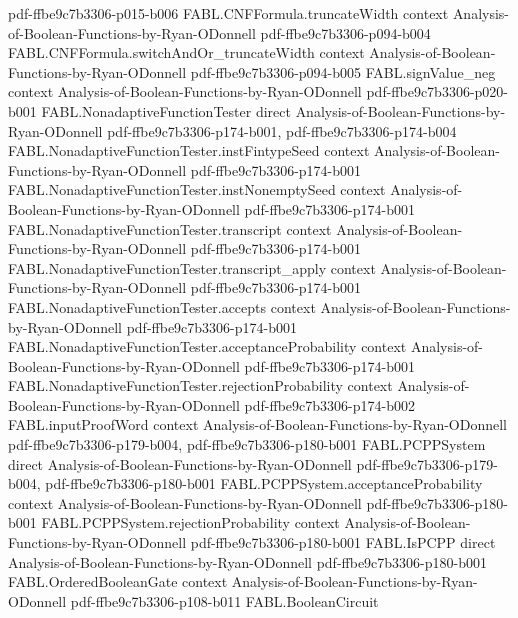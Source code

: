 \begin{theorem}
  {pdf-ffbe9c7b3306-p015-b006}
\proofstep
  {FABL.CNFFormula.truncateWidth}
  {context}
  {Analysis-of-Boolean-Functions-by-Ryan-ODonnell}
  {pdf-ffbe9c7b3306-p094-b004}
\proofstep
  {FABL.CNFFormula.switchAndOr_truncateWidth}
  {context}
  {Analysis-of-Boolean-Functions-by-Ryan-ODonnell}
  {pdf-ffbe9c7b3306-p094-b005}
\proofstep
  {FABL.signValue_neg}
  {context}
  {Analysis-of-Boolean-Functions-by-Ryan-ODonnell}
  {pdf-ffbe9c7b3306-p020-b001}
\proofstep
  {FABL.NonadaptiveFunctionTester}
  {direct}
  {Analysis-of-Boolean-Functions-by-Ryan-ODonnell}
  {pdf-ffbe9c7b3306-p174-b001,
    pdf-ffbe9c7b3306-p174-b004}
\proofstep
  {FABL.NonadaptiveFunctionTester.instFintypeSeed}
  {context}
  {Analysis-of-Boolean-Functions-by-Ryan-ODonnell}
  {pdf-ffbe9c7b3306-p174-b001}
\proofstep
  {FABL.NonadaptiveFunctionTester.instNonemptySeed}
  {context}
  {Analysis-of-Boolean-Functions-by-Ryan-ODonnell}
  {pdf-ffbe9c7b3306-p174-b001}
\proofstep
  {FABL.NonadaptiveFunctionTester.transcript}
  {context}
  {Analysis-of-Boolean-Functions-by-Ryan-ODonnell}
  {pdf-ffbe9c7b3306-p174-b001}
\proofstep
  {FABL.NonadaptiveFunctionTester.transcript_apply}
  {context}
  {Analysis-of-Boolean-Functions-by-Ryan-ODonnell}
  {pdf-ffbe9c7b3306-p174-b001}
\proofstep
  {FABL.NonadaptiveFunctionTester.accepts}
  {context}
  {Analysis-of-Boolean-Functions-by-Ryan-ODonnell}
  {pdf-ffbe9c7b3306-p174-b001}
\proofstep
  {FABL.NonadaptiveFunctionTester.acceptanceProbability}
  {context}
  {Analysis-of-Boolean-Functions-by-Ryan-ODonnell}
  {pdf-ffbe9c7b3306-p174-b001}
\proofstep
  {FABL.NonadaptiveFunctionTester.rejectionProbability}
  {context}
  {Analysis-of-Boolean-Functions-by-Ryan-ODonnell}
  {pdf-ffbe9c7b3306-p174-b002}
\proofstep
  {FABL.inputProofWord}
  {context}
  {Analysis-of-Boolean-Functions-by-Ryan-ODonnell}
  {pdf-ffbe9c7b3306-p179-b004,
    pdf-ffbe9c7b3306-p180-b001}
\proofstep
  {FABL.PCPPSystem}
  {direct}
  {Analysis-of-Boolean-Functions-by-Ryan-ODonnell}
  {pdf-ffbe9c7b3306-p179-b004,
    pdf-ffbe9c7b3306-p180-b001}
\proofstep
  {FABL.PCPPSystem.acceptanceProbability}
  {context}
  {Analysis-of-Boolean-Functions-by-Ryan-ODonnell}
  {pdf-ffbe9c7b3306-p180-b001}
\proofstep
  {FABL.PCPPSystem.rejectionProbability}
  {context}
  {Analysis-of-Boolean-Functions-by-Ryan-ODonnell}
  {pdf-ffbe9c7b3306-p180-b001}
\proofstep
  {FABL.IsPCPP}
  {direct}
  {Analysis-of-Boolean-Functions-by-Ryan-ODonnell}
  {pdf-ffbe9c7b3306-p180-b001}
\proofstep
  {FABL.OrderedBooleanGate}
  {context}
  {Analysis-of-Boolean-Functions-by-Ryan-ODonnell}
  {pdf-ffbe9c7b3306-p108-b011}
\proofstep
  {FABL.BooleanCircuit}

\end{theorem}
